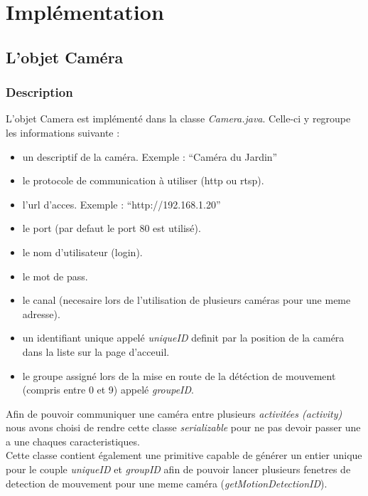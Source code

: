 \chapter{Implémentation}
\section{L'objet Caméra}
\subsection{Description}
L'objet Camera est implémenté dans la classe \textit{Camera.java}.\newline
Celle-ci y regroupe les informations suivante : 
\begin{itemize} 
\item un descriptif de la caméra. Exemple : ``Caméra du Jardin''
\item le protocole de communication à utiliser (http ou rtsp).
\item l'url d'acces. Exemple : ``http://192.168.1.20''
\item le port (par defaut le port 80 est utilisé).
\item le nom d'utilisateur (login).
\item le mot de pass.
\item le canal (necesaire lors de l'utilisation de plusieurs caméras pour une
meme adresse).
\item un identifiant unique appelé \textit{uniqueID} definit par la position de
la caméra dans la liste sur la page d'acceuil.
\item le groupe assigné lors de la mise en route de la détéction de mouvement
(compris entre 0 et 9) appelé \textit{groupeID}.\\
\end{itemize}
Afin de pouvoir communiquer une caméra entre plusieurs \textit{activitées
(activity)} nous avons choisi de rendre cette classe \textit{serializable} pour
ne pas devoir passer une a une chaques caracteristiques.\\
Cette classe contient également une primitive capable de générer un entier
unique pour le couple \textit{uniqueID} et \textit{groupID} afin de pouvoir
lancer plusieurs fenetres de detection de mouvement pour une meme caméra
(\textit{getMotionDetectionID}).
